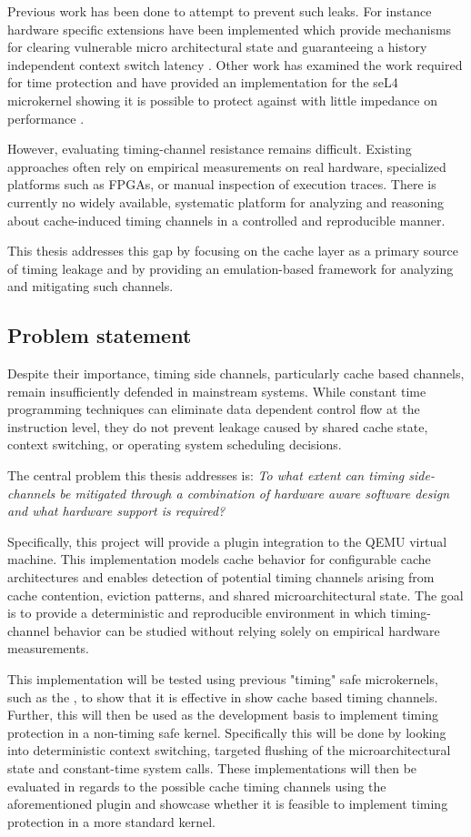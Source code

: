 Previous work has been done to attempt to prevent such leaks. For instance
hardware specific extensions have been implemented which provide mechanisms for
clearing vulnerable micro architectural state and guaranteeing a
history independent context switch latency \cite{fencet}. Other work has
examined the work required for time protection and have provided an
implementation for the seL4 microkernel showing it is possible to protect
against with little impedance on performance \cite{MissingOSAbstraction}.

However, evaluating timing-channel resistance remains difficult. Existing
approaches often rely on empirical measurements on real hardware, specialized
platforms such as FPGAs, or manual inspection of execution traces. There is
currently no widely available, systematic platform for analyzing and reasoning
about cache-induced timing channels in a controlled and reproducible manner.

This thesis addresses this gap by focusing on the cache layer as a primary
source of timing leakage and by providing an emulation-based framework for
analyzing and mitigating such channels.

\subsection{Problem statement}
Despite their importance, timing side channels, particularly cache based
channels, remain insufficiently defended in mainstream systems. While
constant time programming techniques can eliminate data dependent control flow
at the instruction level, they do not prevent leakage caused by shared cache
state, context switching, or operating system scheduling decisions.

The central problem this thesis addresses is: \emph{To what extent can timing
side-channels be mitigated through a combination of hardware aware software
design and what hardware support is required?}

Specifically, this project will provide a plugin integration to the QEMU
virtual machine. This implementation models cache behavior for configurable
cache architectures and enables detection of potential timing channels arising
from cache contention, eviction patterns, and shared microarchitectural state.
The goal is to provide a deterministic and reproducible environment in which
timing-channel behavior can be studied without relying solely on empirical
hardware measurements.

This implementation will be tested using previous "timing" safe microkernels,
such as the \cite{S3K}, to show that it is effective in show cache based timing
channels. Further, this will then be used as the development basis to implement
timing protection in a non-timing safe kernel. Specifically this will be done
by looking into deterministic context switching, targeted flushing of the
microarchitectural state and constant-time system calls. These implementations
will then be evaluated in regards to the possible cache timing channels using
the aforementioned plugin and showcase whether it is feasible to implement
timing protection in a more standard kernel.


